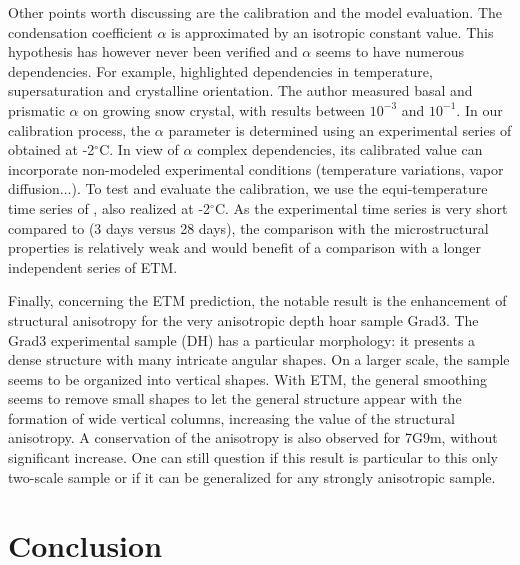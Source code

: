 \documentclass[draft,ms]{agujournal2019}
\begin{document}
Other points worth discussing are the calibration and the model evaluation. The condensation coefficient $\alpha$ is approximated by an isotropic constant value. This hypothesis has however never been verified and $\alpha$ seems to have numerous dependencies. For example,  highlighted dependencies in temperature, supersaturation and crystalline orientation. The author measured basal and prismatic $\alpha$ on growing snow crystal, with results between $10^{-3}$ and $10^{-1}$.
In our calibration process, the $\alpha$ parameter is determined using an experimental series of  obtained at -2$^\circ$C. In view of $\alpha$ complex dependencies, its calibrated value can incorporate non-modeled experimental conditions (temperature variations, vapor diffusion...).
To test and evaluate the calibration, we use the equi-temperature time series of , also realized at -2$^\circ$C. As the experimental time series is very short compared to  (3 days versus 28 days), the comparison with the microstructural properties is relatively weak and would benefit of a comparison with a longer independent series of ETM. 

Finally, concerning the ETM prediction, the notable result is the enhancement of structural anisotropy for the very anisotropic depth hoar sample Grad3. The Grad3 experimental sample (DH) has a particular morphology: it presents a dense structure with many intricate angular shapes. On a larger scale, the sample seems to be organized into vertical shapes. With ETM, the general smoothing seems to remove small shapes to let the general structure appear with the formation of wide vertical columns, increasing the value of the structural anisotropy. A conservation of the anisotropy is also observed for 7G9m, without significant increase. One can still question if this result is particular to this only two-scale sample or if it can be generalized for any strongly anisotropic sample. 

\section{Conclusion}
\label{sec:conclusion}
\end{document}
